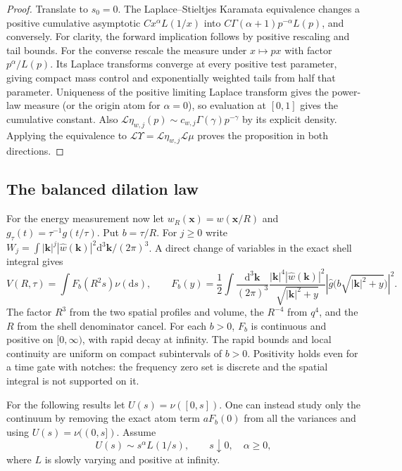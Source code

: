 \documentclass[11pt]{article}
\theoremstyle{remark}
\newcommand{\dd}{\mathrm d}
\newcommand{\scrL}{\mathcal L}
\begin{document}
\begin{proof}
Translate to \(s_0=0\). The Laplace--Stieltjes Karamata
equivalence \cite{Karamata,BGT} changes a positive cumulative
asymptotic \(Cx^\alpha L(1/x)\) into
\(C\Gamma(\alpha+1)p^{-\alpha}L(p)\), and conversely.
For clarity, the forward implication follows by positive
rescaling and tail bounds. For the converse rescale the
measure under \(x\mapsto px\) with factor \(p^\alpha/L(p)\).
Its Laplace transforms converge at every positive test
parameter, giving compact mass control and exponentially
weighted tails from half that parameter. Uniqueness of the
positive limiting Laplace transform gives the power-law
measure (or the origin atom for \(\alpha=0\)), so evaluation
at \([0,1]\) gives the cumulative constant.
Also
\(\scrL\eta_{w,j}(p)\sim c_{w,j}\Gamma(\gamma)p^{-\gamma}\)
by its explicit density. Applying the equivalence to
\(\scrL\Upsilon=\scrL\eta_{w,j}\scrL\mu\) proves the proposition
in both directions.
\end{proof}

\subsection{The balanced dilation law}

For the energy measurement now let
\(w_R(\mathbf x)=w(\mathbf x/R)\) and
\(g_\tau(t)=\tau^{-1}g(t/\tau)\).
Put \(b=\tau/R\). For \(j\ge0\) write
\(W_j=\int |\mathbf k|^j|\widehat w(\mathbf k)|^2\dd^3\mathbf k/(2\pi)^3\).
A direct change of variables in the exact shell integral gives
\begin{equation}
 V(R,\tau)=\int F_b(R^2s)\nu(\dd s),\qquad
 F_b(y)=\frac12\int\frac{\dd^3\mathbf k}{(2\pi)^3}
       \frac{|\mathbf k|^4|\widehat w(\mathbf k)|^2}{\sqrt{|\mathbf k|^2+y}}
       \left|\widehat g\bigl(b\sqrt{|\mathbf k|^2+y}\bigr)\right|^2 .
 \label{eq:scale}
\end{equation}
The factor \(R^3\) from the two spatial profiles and volume,
the \(R^{-4}\) from \(q^4\), and the \(R\) from the shell
denominator cancel. For each \(b>0\), \(F_b\) is continuous
and positive on \([0,\infty)\), with rapid decay at infinity.
The rapid bounds and local continuity are uniform on compact
subintervals of \(b>0\). Positivity holds even for a time
gate with notches: the frequency zero set is discrete and
the spatial integral is not supported on it.

For the following results let \(U(s)=\nu([0,s])\).
One can instead study only the continuum by removing the exact
atom term \(a F_b(0)\) from all the variances and using
\(U(s)=\nu((0,s])\). Assume
\begin{equation}
             U(s)\sim s^\alpha L(1/s),\qquad s\downarrow0,
             \quad \alpha\ge0,
 \label{eq:rv}
\end{equation}
where \(L\) is slowly varying and positive at infinity.
\end{document}
